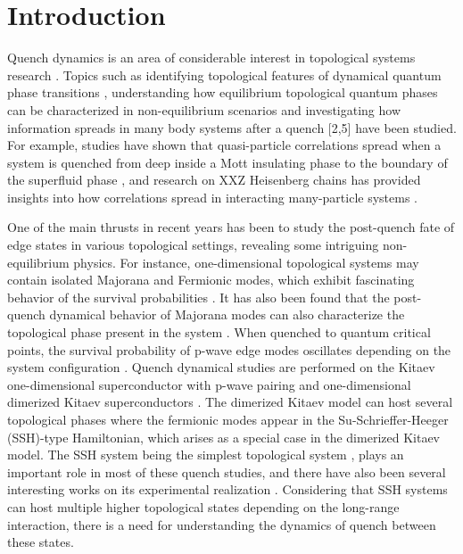 \documentclass[aps,pra,reprint,superscriptaddress,longbibliography]{revtex4-2}
\begin{document}
	
	
	\section{Introduction \label{sec:1}}
Quench dynamics is an area of considerable interest in topological systems research \cite{sacramento2016edge, wang2018detecting, budich2016dynamical, yang2018dynamical, zhang2018dynamical, rajak2014survival, rajak2017survival, sacramento2014fate}. Topics such as identifying topological features of dynamical quantum phase transitions \cite{budich2016dynamical, yang2018dynamical}, understanding how equilibrium topological quantum phases can be characterized in non-equilibrium scenarios \cite{zhang2018dynamical} and investigating how information spreads in many body systems after a quench [2,5] have been studied. For example, studies have shown that quasi-particle correlations spread when a system is quenched from deep inside a Mott insulating phase to the boundary of the superfluid phase \cite{cheneau2012light, bernier2018light}, and research on XXZ Heisenberg chains has provided insights into how correlations spread in interacting many-particle systems \cite{bonnes2014light}.

One of the main thrusts in recent years has been to study the post-quench fate of edge states in various topological settings, revealing some intriguing non-equilibrium physics. For instance, one-dimensional topological systems may contain isolated Majorana and Fermionic modes, which exhibit fascinating behavior of the survival probabilities \cite{sacramento2016edge}. It has also been found that the post-quench dynamical behavior of Majorana modes can also characterize the topological phase present in the system \cite{wang2018detecting}. When quenched to quantum critical points, the survival probability of p-wave edge modes oscillates depending on the system configuration \cite{rajak2014survival, rajak2017survival, sacramento2014fate}. Quench dynamical studies are performed on the Kitaev one-dimensional superconductor \cite{kitaev2001unpaired} with p-wave pairing and one-dimensional dimerized Kitaev superconductors \cite{wakatsuki2014fermion}. The dimerized Kitaev model can host several topological phases where the fermionic modes appear in the Su-Schrieffer-Heeger (SSH)-type Hamiltonian, which arises as a special case in the dimerized Kitaev model. The SSH system being the simplest topological system \cite{asboth2016short, su1979solitons}, plays an important role in most of these quench studies, and there have also been several interesting works on its experimental realization \cite{kiczynski2022engineering, meier2016observation, liu2022ta, cooper2019topological}. Considering that SSH systems can host multiple higher topological states depending on the long-range interaction, there is a need for understanding the dynamics of quench between these states.
  
\end{document}
